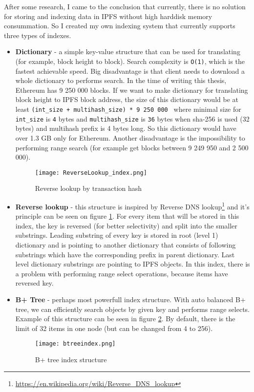 After some research, I came to the conclusion that currently, there is no solution for storing and indexing data in IPFS without high harddisk memory consummation. So I created my own indexing system that currently supports three types of indexes.

\begin{itemize}
    \item \textbf{Dictionary} - a simple key-value structure that can be used for translating (for example, block height to block). Search complexity is \texttt{O(1)}, which is the fastest achievable speed. Big disadvantage is that client needs to download a whole dictionary to performs search. In the time of writing this thesis, Ethereum has 9 250 000 blocks. If we want to make dictionary for translating block height to IPFS block address, the size of this dictionary would be at least \texttt{(int\_size + multihash\_size) * 9 250 000 } where minimal size for \texttt{int\_size} is \texttt{4} bytes and \texttt{multihash\_size} is \texttt{36} bytes when sha-256 is used (32 bytes) and multihash prefix is 4 bytes long. So this dictionary would have over 1.3 GB only for Ethereum. Another disadvantage is the impossibility to performing range search (for example get blocks between 9 249 950 and 2 500 000).

    \begin{figure}[h]
        \centering
        \texttt{[image: ReverseLookup\_index.png]}
        \caption{Reverse lookup by transaction hash}
        \label{reverseLookupIndex}
    \end{figure}


    \item \textbf{Reverse lookup} - this structure is inspired by Reverse DNS lookup\footnote{\url{https://en.wikipedia.org/wiki/Reverse_DNS_lookup}} and it's principle can be seen on figure \ref{reverseLookupIndex}. For every item that will be stored in this index, the key is reversed (for better selectivity) and split into the smaller substrings. Leading substring of every key is stored in root (level 1) dictionary and is pointing to another dictionary that consists of following substrings which have the corresponding prefix in parent dictionary. Last level dictionary substrings are pointing to IPFS objects. In this index, there is a problem with performing range select operations, because items have reversed key.
    \item \textbf{B+ Tree} - perhaps most powerfull index structure. With auto balanced B+ tree, we can efficiently search objects by given key and performs range selects. Example of this structure can be seen in figure \ref{btreeindex}. By default, there is the limit of 32 items in one node (but can be changed from 4 to 256). 
    


    \begin{figure}[h]
        \centering
        \texttt{[image: btreeindex.png]}
        \caption{B+ tree index structure}
        \label{btreeindex}
    \end{figure}

\end{itemize}

